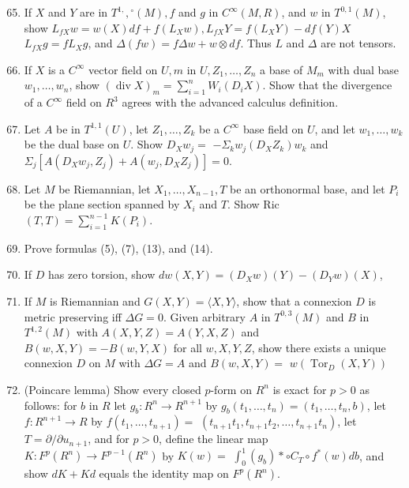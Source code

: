 \documentclass[10pt]{article}
\begin{document}
\begin{enumerate}
  \setcounter{enumi}{64}
  \item If $X$ and $Y$ are in $T^{1,},{ }^{\circ}(M), f$ and $g$ in $C^{\infty}(M, R)$, and $w$ in $T^{0,1}(M)$, show $L_{f X} w=w(X) d f+f\left(L_{X} w\right), L_{f X} Y=f\left(L_{X} Y\right)-d f(Y) X$ $L_{f X} g=f L_{X} g$, and $\Delta(f w)=f \Delta w+w \otimes d f$. Thus $L$ and $\Delta$ are not tensors.

  \item If $X$ is a $C^{\infty}$ vector field on $U, m$ in $U, Z_{1}, \ldots, Z_{n}$ a base of $M_{m}$ with dual base $w_{1}, \ldots, w_{n}$, show $(\operatorname{div} X)_{m}=\sum_{i=1}^{n} W_{i}\left(D_{i} X\right)$. Show that the divergence of a $C^{\infty}$ field on $R^{3}$ agrees with the advanced calculus definition.

  \item Let $A$ be in $T^{1,1}(U)$, let $Z_{1}, \ldots, Z_{k}$ be a $C^{\infty}$ base field on $U$, and let $w_{1}, \ldots, w_{k}$ be the dual base on $U$. Show $D_{X} w_{j}=$ $-\Sigma_{k} w_{j}\left(D_{X} Z_{k}\right) w_{k}$ and $\Sigma_{j}\left[A\left(D_{X} w_{j}, Z_{j}\right)+A\left(w_{j}, D_{X} Z_{j}\right)\right]=0$.

  \item Let $M$ be Riemannian, let $X_{1}, \ldots, X_{n-1}, T$ be an orthonormal base, and let $P_{i}$ be the plane section spanned by $X_{i}$ and $T$. Show Ric $(T, T)=\sum_{i=1}^{n-1} K\left(P_{i}\right)$.

  \item Prove formulas (5), (7), (13), and (14).

  \item If $D$ has zero torsion, show $d w(X, Y)=\left(D_{X} w\right)(Y)-\left(D_{Y} w\right)(X)$,

  \item If $M$ is Riemannian and $G(X, Y)=\langle X, Y\rangle$, show that a connexion $D$ is metric preserving iff $\Delta G=0$. Given arbitrary $A$ in $T^{0,3}(M)$ and $B$ in $T^{1,2}(M)$ with $A(X, Y, Z)=A(Y, X, Z)$ and $B(w, X, Y)=-B(w, Y, X)$ for all $w, X, Y, Z$, show there exists a unique connexion $D$ on $M$ with $\Delta G=A$ and $B(w, X, Y)=$ $w\left(\operatorname{Tor}_{D}(X, Y)\right)$

  \item (Poincare lemma) Show every closed $p$-form on $R^{n}$ is exact for $p>0$ as follows: for $b$ in $R$ let $g_{b}: R^{n} \rightarrow R^{n+1}$ by $g_{b}\left(t_{1}, \ldots, t_{n}\right)=\left(t_{1}, \ldots, t_{n}, b\right)$, let $f: R^{n+1} \rightarrow R$ by $f\left(t_{1}, \ldots, t_{n+1}\right)=$ $\left(t_{n+1} t_{1}, t_{n+1} t_{2}, \ldots, t_{n+1} t_{n}\right)$, let $T=\partial / \partial u_{n+1}$, and for $p>0$, define the linear map $K: F^{p}\left(R^{n}\right) \rightarrow F^{p-1}\left(R^{n}\right)$ by $K(w)=$ $\int_{0}^{1}\left(g_{b}\right) * \circ C_{T} \circ f^{*}(w) d b$, and show $d K+K d$ equals the identity map on $F^{p}\left(R^{n}\right)$.


\end{enumerate}
\end{document}
